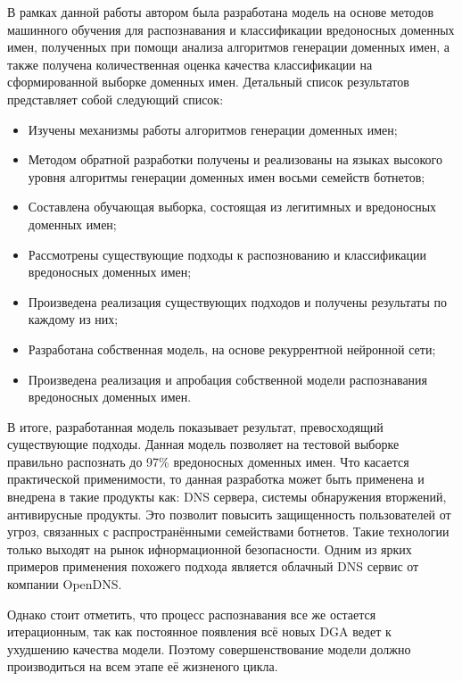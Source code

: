 В рамках данной работы автором была разработана модель на основе методов машинного обучения для распознавания и классификации вредоносных доменных имен, полученных при помощи анализа алгоритмов генерации доменных имен, а также получена количественная оценка качества классификации на сформированной выборке доменных имен. Детальный список результатов представляет собой следующий список:
\begin{itemize}
\item Изучены механизмы работы алгоритмов генерации доменных имен;
\item Методом обратной разработки получены и реализованы на языках высокого уровня алгоритмы генерации доменных имен восьми семейств ботнетов;
\item Составлена обучающая выборка, состоящая из легитимных и вредоносных доменных имен;
\item Рассмотрены существующие подходы к распознованию и классификации вредоносных доменных имен;
\item Произведена реализация существующих подходов и получены результаты по каждому из них;
\item Разработана собственная модель, на основе рекуррентной нейронной сети;
\item Произведена реализация и апробация собственной модели распознавания вредоносных доменных имен.
\end{itemize}

В итоге, разработанная модель показывает результат, превосходящий существующие подходы. Данная модель позволяет на тестовой выборке правильно распознать до 97\% вредоносных доменных имен.
Что касается практической применимости, то данная разработка может быть применена и внедрена в такие продукты как: DNS сервера, системы обнаружения вторжений, антивирусные продукты. Это позволит повысить защищенность пользователей от угроз, связанных с распространёнными семействами ботнетов. Такие технологии только выходят на рынок ифнормационной безопасности. Одним из ярких примеров применения похожего подхода является облачный DNS сервис от компании OpenDNS. 

Однако стоит отметить, что процесс распознавания все же остается итерационным, так как постоянное появления всё новых DGA ведет к ухудшению качества модели. Поэтому совершенствование модели должно производиться на всем этапе её жизненого цикла.
\clearpage